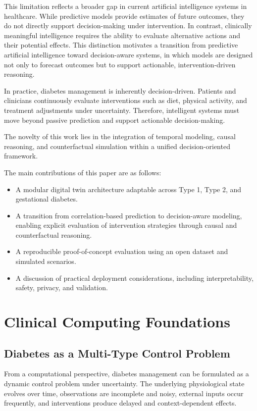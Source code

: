 \documentclass[journal]{IEEEtran}
\begin{document}
This limitation reflects a broader gap in current artificial intelligence systems in healthcare. While predictive models provide estimates of future outcomes, they do not directly support decision-making under intervention. In contrast, clinically meaningful intelligence requires the ability to evaluate alternative actions and their potential effects. This distinction motivates a transition from predictive artificial intelligence toward decision-aware systems, in which models are designed not only to forecast outcomes but to support actionable, intervention-driven reasoning.

In practice, diabetes management is inherently decision-driven. Patients and clinicians continuously evaluate interventions such as diet, physical activity, and treatment adjustments under uncertainty. Therefore, intelligent systems must move beyond passive prediction and support actionable decision-making.

The novelty of this work lies in the integration of temporal modeling, causal reasoning, and counterfactual simulation within a unified decision-oriented framework.

The main contributions of this paper are as follows:
\begin{itemize}
\item A modular digital twin architecture adaptable across Type 1, Type 2, and gestational diabetes.
\item A transition from correlation-based prediction to decision-aware modeling, enabling explicit evaluation of intervention strategies through causal and counterfactual reasoning.
\item A reproducible proof-of-concept evaluation using an open dataset and simulated scenarios.
\item A discussion of practical deployment considerations, including interpretability, safety, privacy, and validation.
\end{itemize}

\section{Clinical Computing Foundations}
\subsection{Diabetes as a Multi-Type Control Problem}
From a computational perspective, diabetes management can be formulated as a dynamic control problem under uncertainty. The underlying physiological state evolves over time, observations are incomplete and noisy, external inputs occur frequently, and interventions produce delayed and context-dependent effects.
\end{document}
